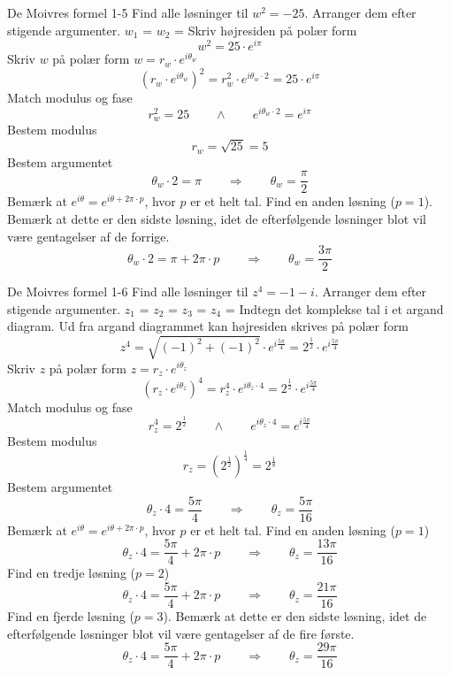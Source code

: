 \documentclass{article}
\begin{document}
\newpage
\begin{exercise}{De Moivres formel 1-5}
Find alle løsninger til $w^2 = - 25$.
Arranger dem efter stigende argumenter.
$w_1$ = 
$w_2$ = 
\hint
Skriv højresiden på polær form
\[w^2 = 25 \cdot e^{i \pi}
\]
\hint
Skriv $w$ på polær form $w = r_w \cdot e^{i \theta_w}$
\[\left(r_w \cdot e^{i \theta_w}\right)^2 = r_w^2 \cdot e^{i \theta_w \cdot 2} = 25 \cdot e^{i \pi}
\]
\hint
Match modulus og fase
\[r_w^2 = 25 \qquad \wedge \qquad e^{i \theta_w \cdot 2} = e^{i \pi}
\]
\hint
Bestem modulus
\[r_w = \sqrt{25} = 5
\]
\hint
Bestem argumentet
\[\theta_w \cdot 2 = \pi \qquad \Rightarrow \qquad \theta_w = \frac{\pi}{2}
\]
\hint
Bemærk at $e^{i \theta} = e^{i \theta + 2 \pi \cdot p}$, hvor $p$ er et helt tal.
\hint
Find en anden løsning ($p = 1$).
Bemærk at dette er den sidste løsning, idet de efterfølgende
løsninger blot vil være gentagelser af de forrige.
\[\theta_w \cdot 2 = \pi + 2 \pi \cdot p \qquad \Rightarrow \qquad \theta_w = \frac{3 \pi}{2}
\]
\end{exercise}
\newpage
\begin{exercise}{De Moivres formel 1-6}
Find alle løsninger til $z^4 = - 1 - i$.
Arranger dem efter stigende argumenter.
$z_1$ = 
$z_2$ = 
$z_3$ = 
$z_4$ = 
\hint
Indtegn det komplekse tal i et argand diagram.
\hint
Ud fra argand diagrammet kan højresiden skrives på polær form
\[z^4 = \sqrt{(-1)^2 + (-1)^2} \cdot e^{i \frac{5 \pi}{4}} = 2^{\frac{1}{2}} \cdot e^{i \frac{5 \pi}{4}}
\]
\hint
Skriv $z$ på polær form $z = r_z \cdot e^{i \theta_z}$
\[\left(r_z \cdot e^{i \theta_z}\right)^4 = r_z^4 \cdot e^{i \theta_z \cdot 4} = 2^{\frac{1}{2}} \cdot e^{i \frac{5 \pi}{4}}
\]
\hint
Match modulus og fase
\[r_z^4 = 2^{\frac{1}{2}} \qquad \wedge \qquad e^{i \theta_z \cdot 4} = e^{i \frac{5 \pi}{4}}
\]
\hint
Bestem modulus
\[r_z = \left(2^{\frac{1}{2}} \right)^{\frac{1}{4}} = 2^{\frac{1}{8}}
\]
\hint
Bestem argumentet
\[\theta_z \cdot 4 = \frac{5 \pi}{4} \qquad \Rightarrow \qquad \theta_z = \frac{5\pi}{16}
\]
\hint
Bemærk at $e^{i \theta} = e^{i \theta + 2 \pi \cdot p}$, hvor $p$ er et helt tal.
\hint
Find en anden løsning ($p = 1$)
\[\theta_z \cdot 4 = \frac{5\pi}{4} + 2 \pi \cdot p \qquad \Rightarrow \qquad \theta_z = \frac{13 \pi}{16}
\]
\hint
Find en tredje løsning ($p = 2$)
\[\theta_z \cdot 4 = \frac{5\pi}{4} + 2 \pi \cdot p \qquad \Rightarrow \qquad \theta_z = \frac{21 \pi}{16}
\]
\hint
Find en fjerde løsning ($p = 3$).
Bemærk at dette er den sidste løsning, idet de efterfølgende
løsninger blot vil være gentagelser af de fire første.
\[\theta_z \cdot 4 = \frac{5\pi}{4} + 2 \pi \cdot p \qquad \Rightarrow \qquad \theta_z = \frac{29 \pi}{16}
\]
\end{exercise}
\end{document}
